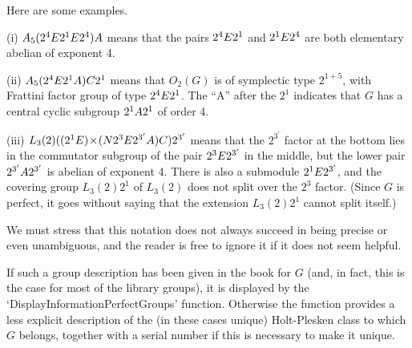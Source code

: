 {Here are some examples.
\item{(i)}  $A_5 (2^4 {\sl E} 2^1 {\sl E} 2^4) {\sl A}$  means  that  the
      pairs  $2^4 {\sl E} 2^1$  and $2^1 {\sl E} 2^4$ are both elementary
      abelian of exponent 4.
\item{(ii)}   $A_5 (2^4 {\sl E} 2^1 {\sl A}) {\sl C} 2^1$    means   that
      $O_2(G)$  is of  symplectic type  $2^{1+5}$,  with  Frattini factor
      group  of type   $2^4 {\sl E} 2^1$.   The   ``A''  after the  $2^1$
      indicates that $G$ has a  central cyclic subgroup $2^1 {\sl A} 2^1$
      of order 4.
\item{(iii)}     $L_3(2) ((2^1 {\sl E}) \! \times \! ({\sl N} 2^3 {\sl E}
      2^{3^\prime} {\sl A}) {\sl C}) 2^{3^\prime}$    means   that    the
      $2^{3^\prime}$ factor at the bottom lies in the commutator subgroup
      of the pair $2^3 {\sl E} 2^{3^\prime}$ in the middle, but the lower
      pair $2^{3^\prime} {\sl A} 2^{3^\prime}$  is abelian of exponent 4.
      There  is  also  a submodule  $2^1 {\sl E} 2^{3^\prime}$,  and  the
      covering group  $L_3(2) 2^1$  of  $L_3(2)$  does not split over the
      $2^3$  factor.  (Since $G$ is perfect,  it goes without saying that
      the extension $L_3(2) 2^1$ cannot split itself.)

We  must  stress  that this  notation does   not  always succeed in being
precise  or even unambiguous, and the  reader is free to  ignore it if it
does not seem helpful.\par}

If such a group description has  been given in  the book for $G$ (and, in
fact, this is the case for  most of the library  groups), it is displayed
by the `DisplayInformationPerfectGroups' function. Otherwise the function
provides a less explicit  description  of  the  (in these cases   unique)
Holt-Plesken class to which $G$ belongs, together with a serial number if
this is necessary to make it unique.


